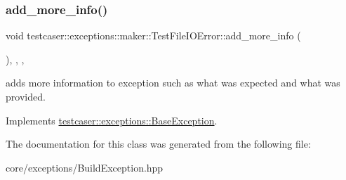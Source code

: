 \subsubsection{\texorpdfstring{add\_more\_info()}{add\_more\_info()}}
{\footnotesize\ttfamily void testcaser\+::exceptions\+::maker\+::\+Test\+File\+I\+O\+Error\+::add\+\_\+more\+\_\+info (\begin{DoxyParamCaption}{ }\end{DoxyParamCaption})\hspace{0.3cm}{\ttfamily [inline]}, {\ttfamily [final]}, {\ttfamily [override]}, {\ttfamily [virtual]}}



adds more information to exception such as what was expected and what was provided. 



Implements \mbox{\hyperlink{classtestcaser_1_1exceptions_1_1BaseException_ad607ea04e2cb4ad9b8d0e2e6b6734f2f}{testcaser\+::exceptions\+::\+Base\+Exception}}.



The documentation for this class was generated from the following file\+:\begin{DoxyCompactItemize}
\item 
core/exceptions/Build\+Exception.\+hpp\end{DoxyCompactItemize}
